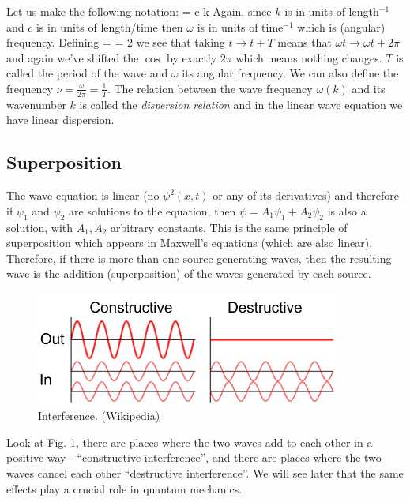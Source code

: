\documentclass{Textbook}
\begin{document}
Let us make the following notation:
\be
\omega = c k 
\ee
Again, since $k$ is in units of length$^{-1}$ and $c$ is in units of length/time then $\omega$ is in units of time$^{-1}$ which is (angular) frequency. Defining
\be
\omega =  = 2\pi \nu
\ee
we see that taking $t\rightarrow t+T$ means that $\omega t \rightarrow \omega t + 2\pi$ and again we've shifted the $\cos$ by exactly $2\pi$ which means nothing changes. $T$ is called the period of the wave and $\omega$ its angular frequency. We can also define the frequency $\nu = \frac{\omega}{2\pi} = \frac{1}{T}$.\nl
The relation between the wave frequency $\omega(k)$ and its wavenumber $k$ is called the \emph{dispersion relation} and in the linear wave equation we have linear dispersion.

\subsection{Superposition}
The wave equation is linear (no $\psi^2(x,t)$ or any of its derivatives) and therefore if $\psi_1$ and $\psi_2$ are solutions to the equation, then $\psi = A_1\psi_1 + A_2\psi_2$ is also a solution, with $A_1,A_2$ arbitrary constants. This is the same principle of superposition which appears in Maxwell's equations (which are also linear). Therefore, if there is more than one source generating waves, then the resulting wave is the addition (superposition) of the waves generated by each source.
\begin{figure}[!ht]
  \centering
  \includegraphics[width=10cm]{Interference_of_two_waves.pdf}  
  \caption{Interference. \href{http://en.wikipedia.org/wiki/Interference_(wave_propagation)}{(Wikipedia)}}
  \label{fig:superposition}
\end{figure}
Look at Fig. \ref{fig:superposition}, there are places where the two waves add to each other in a positive way - ``constructive interference'', and there are places where the two waves cancel each other ``destructive interference''. We will see later that the same effects play a crucial role in quantum mechanics.
\end{document}
